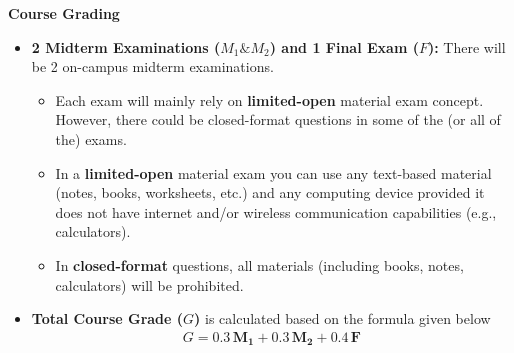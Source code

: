 \documentclass[11pt,oneside]{amsart}
\newcommand{\header}[1]{\bigbreak\textbf{#1}}
\begin{document}
\vspace{6pt}

\header{Course Grading}

\begin{itemize}

\item \textbf{2 Midterm Examinations ($M_1 \& M_2$) and 1 Final Exam ($F$):} There
  will be 2 on-campus midterm examinations. 

\vspace{3pt}

\begin{itemize}

\item Each exam will mainly rely on \textbf{limited-open} material
  exam concept. However, there could be closed-format questions in some of the (or all of the) exams.

\item In a \textbf{limited-open} material exam you can
use any text-based material (notes, books, worksheets, etc.) and any computing
device provided it does not have internet and/or wireless communication capabilities 
(e.g., calculators).

\item In \textbf{closed-format} questions, all materials (including
 books, notes, calculators) will be prohibited. 

\end{itemize}

\vspace{6pt}

\item \textbf{Total Course Grade ($G$)} is calculated based on the
  formula given below
%
\begin{align*}
  G = 0.3 \, \mathbf{M_1} + 0.3 \, \mathbf{M_2} + 0.4 \, \mathbf{F} 
\end{align*}

\end{itemize}
\end{document}
